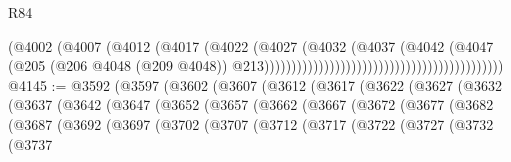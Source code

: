 \begin{lexlean}{R84}
\begin{coremodule}
                                                                      (@4002
                                                                        (@4007
                                                                          (@4012
                                                                            (@4017
                                                                              (@4022
                                                                                (@4027
                                                                                  (@4032
                                                                                    (@4037
                                                                                      (@4042
                                                                                        (@4047
                                                                                          (@205
                                                                                            (@206
                                                                                              @4048
                                                                                              (@209
                                                                                                @4048))
                                                                                            @213))))))))))))))))))))))))))))))))))))))))))))
@4145 := @3592
    (@3597
      (@3602
        (@3607
          (@3612
            (@3617
              (@3622
                (@3627
                  (@3632
                    (@3637
                      (@3642
                        (@3647
                          (@3652
                            (@3657
                              (@3662
                                (@3667
                                  (@3672
                                    (@3677
                                      (@3682
                                        (@3687
                                          (@3692
                                            (@3697
                                              (@3702
                                                (@3707
                                                  (@3712
                                                    (@3717
                                                      (@3722
                                                        (@3727
                                                          (@3732
                                                            (@3737

\end{coremodule}
\end{lexlean}

